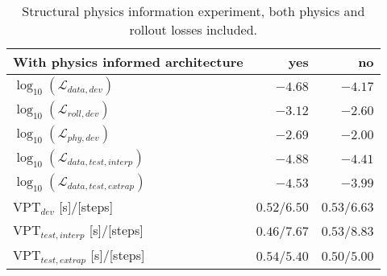\begin{table}[!b]
\centering
\caption{Structural physics information experiment, both physics and rollout losses included.}
\label{tab:position_rotated_pinn_rollout}
\begin{tabular}{l|r|r|}
\textbf{With physics informed architecture} & \textbf{yes}  & \textbf{no}   \\ \hline
$\log_{10}(\mathcal{L}_{data,dev})$         & $\bm{-4.68}$  & $-4.17$       \\ \hline
$\log_{10}(\mathcal{L}_{roll,dev})$         & $\bm{-3.12}$  & $-2.60$       \\ \hline
$\log_{10}(\mathcal{L}_{phy,dev})$          & $\bm{-2.69}$  & $-2.00$       \\ \hline
$\log_{10}(\mathcal{L}_{data,test,interp})$ & $\bm{-4.88}$  & $-4.41$       \\ \hline
$\log_{10}(\mathcal{L}_{data,test,extrap})$ & $\bm{-4.53}$  & $-3.99$       \\ \hline
$\text{VPT}_{dev}$ [s]/[steps]              & $0.52$/$6.50$ & $\bm{0.53}$/$6.63$ \\ \hline
$\text{VPT}_{test,interp}$ [s]/[steps]      & $0.46$/$7.67$ & $\bm{0.53}$/$8.83$ \\ \hline
$\text{VPT}_{test,extrap}$ [s]/[steps]      & $\bm{0.54}$/$5.40$ & $0.50$/$5.00$
\end{tabular}
\end{table}